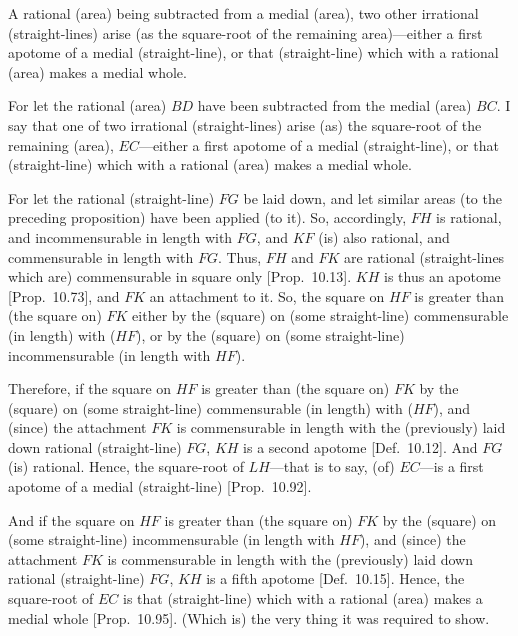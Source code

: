 \begin{Parallel}{}{}
{A rational (area) being subtracted from
a medial (area), two other irrational (straight-lines) arise (as the square-root
of the remaining area)---either a first apotome of a medial (straight-line),
or that (straight-line) which with a rational (area) makes a medial whole.

For let the rational (area) $BD$ have been subtracted from the medial
(area) $BC$. I say that one of two irrational (straight-lines) arise (as) the square-root of the remaining (area), $EC$---either a first apotome of a medial
(straight-line), or that (straight-line) which with a rational (area) makes
a medial whole.

For let the rational (straight-line) $FG$ be laid down, and let
similar areas (to the preceding proposition) have  been applied (to it). So,
accordingly, $FH$ is rational, and incommensurable in length with
$FG$, and $KF$ (is) also rational, and commensurable
in length with $FG$. Thus, $FH$ and $FK$ are rational (straight-lines which
are) commensurable in square only [Prop.~10.13].
$KH$ is thus an apotome [Prop.~10.73], and $FK$ an attachment to it. So, the square on $HF$ is greater than (the square on)
$FK$ either by the (square) on (some straight-line) commensurable (in length)
with ($HF$), or by the (square) on (some straight-line) incommensurable
(in length with $HF$).

\centerline{}

Therefore, if the square on $HF$ is greater than (the square on) $FK$
by the (square) on (some straight-line) commensurable (in length) with ($HF$),
and (since) the attachment $FK$ is commensurable
in length with the (previously) laid down rational (straight-line) $FG$,
$KH$ is a second apotome [Def.~10.12]. 
And $FG$ (is) rational. Hence, the square-root of $LH$---that is to say, (of)
$EC$---is a first apotome of a medial (straight-line) [Prop.~10.92].

And if the square on $HF$ is greater than (the square on) $FK$
by the (square) on (some straight-line) incommensurable (in length with $HF$),
and (since) the attachment $FK$ is commensurable
in length with the (previously) laid down rational (straight-line) $FG$,
$KH$ is a fifth apotome [Def.~10.15]. Hence,
the square-root of $EC$ is that (straight-line) which with a rational (area)
makes a medial whole [Prop.~10.95]. 
(Which is) the very thing it was required to show.}
\end{Parallel}

